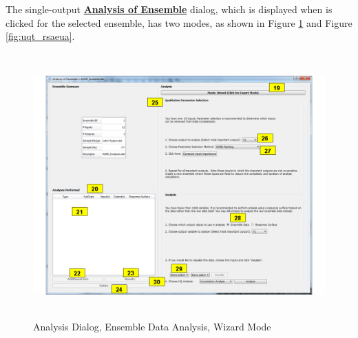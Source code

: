\begin{enumerate}
The single-output \textbf{\underline{Analysis of Ensemble}} dialog, which is displayed when 
is clicked for the selected ensemble, has two modes, as shown in
Figure \ref{fig:uq_analysisW} and Figure \ref{fig:uqt_rsaeua}.  
\begin{figure}[!htb]
\centering \includegraphics[width=6.5in,height=4in,keepaspectratio]{Chapt_uq/figs/overview/3_AnalysisSection2}
\caption{Analysis Dialog, Ensemble Data Analysis, Wizard Mode}
\label{fig:uq_analysisW}
\end{figure}


\end{enumerate}

